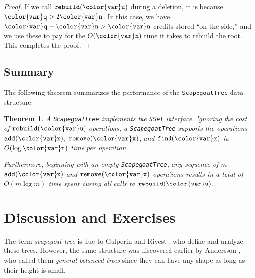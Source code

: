 \documentclass[10pt]{book}
\theoremstyle{plain}
\newtheorem{thm}{Theorem}[chapter]
\newcommand{\thmlabel}[1]{\label{thm:#1}}
\theoremstyle{definition}
\begin{document}
\begin{proof}
  If we call \ensuremath{\mathtt{rebuild({\color{var}u})}} during a deletion, it is because $\ensuremath{\mathtt{{\color{var}q}}} > 2\ensuremath{\mathtt{{\color{var}n}}}$.
  In this case, we have $\ensuremath{\mathtt{{\color{var}q}}}-\ensuremath{\mathtt{{\color{var}n}}}> \ensuremath{\mathtt{{\color{var}n}}}$ credits stored ``on the side,'' and
  we use these to pay for the $O(\ensuremath{\mathtt{{\color{var}n}}})$ time it takes to rebuild the root.
  This completes the proof.
\end{proof}

\subsection{Summary}
The following theorem summarizes the performance of the \texttt{ScapegoatTree} data structure:

\begin{thm}\thmlabel{scapegoat}
  A \texttt{ScapegoatTree} implements the \texttt{SSet} interface. Ignoring the cost
  of \ensuremath{\mathtt{rebuild({\color{var}u})}} operations, a \texttt{ScapegoatTree} supports the operations
  \ensuremath{\mathtt{add({\color{var}x})}}, \ensuremath{\mathtt{remove({\color{var}x})}}, and \ensuremath{\mathtt{find({\color{var}x})}} in $O(\log \ensuremath{\mathtt{{\color{var}n}}})$ time per operation.
  
  Furthermore, beginning with an empty \texttt{ScapegoatTree}, any sequence of $m$
  \ensuremath{\mathtt{add({\color{var}x})}} and \ensuremath{\mathtt{remove({\color{var}x})}} operations results in a total of $O(m\log m)$
  time spent during all calls to \ensuremath{\mathtt{rebuild({\color{var}u})}}.
\end{thm}

\section{Discussion and Exercises}

The term \emph{scapegoat tree} is due to Galperin and Rivest \cite{gr93},
who define and analyze these trees.  However, the same structure
was discovered earlier by Andersson \cite{a89,a99}, who called them
\emph{general balanced trees}
%
since they can have any shape as long as
their height is small.
\end{document}

